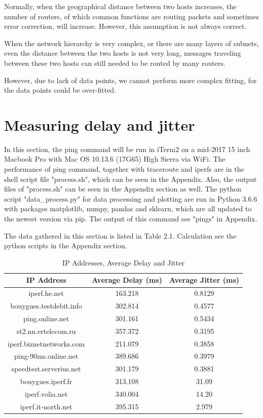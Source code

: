 \documentclass[paper=a4, fontsize=10pt]{scrartcl} %
\numberwithin{equation}{section} %
\numberwithin{figure}{section} %
\numberwithin{table}{section} %
\begin{document}
Normally, when the geographical distance between two hosts increases, the number of routers, of which common functions are routing packets and sometimes error correction, will increase. However, this assumption is not always correct. 

When the network hierarchy is very complex, or there are many layers of subnets, even the distance between the two hosts is not very long, messages traveling between these two hosts can still needed to be routed by many routers.

However, due to lack of data points, we cannot perform more complex fitting, for the data points could be over-fitted.

\section{Measuring delay and jitter}
In this section, the ping command will be run in iTerm2 on a mid-2017 15 inch Macbook Pro with Mac OS 10.13.6 (17G65) High Sierra via WiFi. The performance of ping command, together with traceroute and iperfs are in the shell script file "process.sh", which can be seen in the Appendix. Also, the output files of "process.sh" can be seen in the Appendix section as well. The python script "data\_process.py" for data processing and plotting are run in Python 3.6.6 with packages matplotlib\cite{hunter2007matplotlib}, numpy\cite{Oliphant:2007:PSC:1251563.1251830}, pandas\cite{mckinneypandas,  mckinney-proc-scipy-2010} and sklearn\cite{sklearn_api}, which are all updated to the newest version via pip.   The output of this command see "pings"  in Appendix.

The data gathered in this section is listed in Table 2.1. Calculation see the python scripts in the Appendix section.
\begin{table}[htbp]
    \centering
    \caption{IP Addresses, Average Delay and Jitter}
    \begin{tabular}{ccc}
    \hline
    IP Address &Average Delay (ms) &Average Jitter (ms) \\
    \hline
    iperf.he.net&163.218&0.8129\\
    bouygues.testdebit.info&302.814&0.4577\\
    ping.online.net&301.161&0.5434\\
    st2.nn.ertelecom.ru&357.372&0.3195\\
    iperf.biznetnetworks.com&211.079&0.3858\\
    ping-90ms.online.net&389.686&0.3979\\
    speedtest.serverius.net&301.179&0.3881\\
    bouygues.iperf.fr&313.108&31.09\\
    iperf.volia.net&340.004&14.20\\
    iperf.it-north.net&395.315&2.979\\
    \hline
    \end{tabular}
\end{table}
\end{document}
